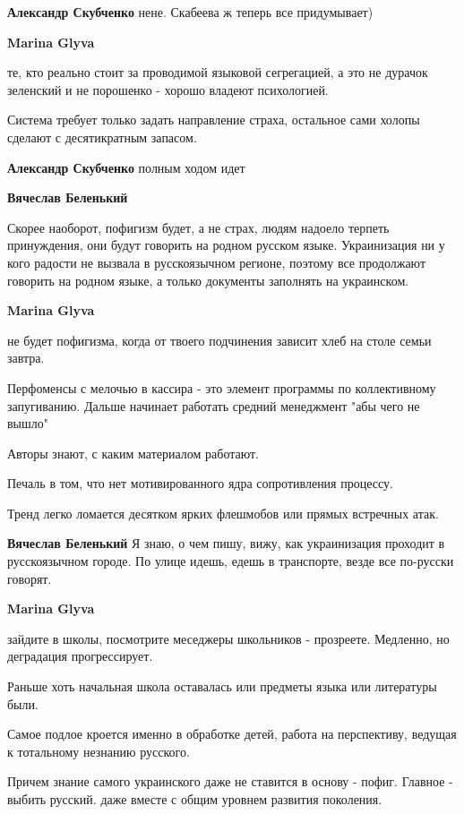 \begin{itemize}
\begin{itemize}
\textbf{Александр Скубченко} нене.
Скабеева ж теперь все придумывает)

\textbf{Marina Glyva} 

те, кто реально стоит за проводимой языковой сегрегацией, а это не дурачок
зеленский и не порошенко - хорошо владеют психологией.

Система требует только задать направление страха, остальное сами холопы сделают с десятикратным запасом.


\textbf{Александр Скубченко} полным ходом идет

\textbf{Вячеслав Беленький} 

Скорее наоборот, пофигизм будет, а не страх, людям надоело терпеть принуждения,
они будут говорить на родном русском языке. Украинизация ни у кого радости не
вызвала в русскоязычном регионе, поэтому все продолжают говорить на родном
языке, а только документы заполнять на украинском.

\textbf{Marina Glyva} 

не будет пофигизма, когда от твоего подчинения зависит хлеб на столе семьи
завтра.

Перфоменсы с мелочью в кассира - это элемент программы по коллективному
запугиванию. Дальше начинает работать средний менеджмент "абы чего не вышло"

Авторы знают, с каким материалом работают.

Печаль в том, что нет мотивированного ядра сопротивления процессу.

Тренд легко ломается десятком ярких флешмобов или прямых встречных атак.

\textbf{Вячеслав Беленький} Я знаю, о чем пишу, вижу, как украинизация проходит в русскоязычном городе. По улице идешь, едешь в транспорте, везде все по-русски говорят.

\textbf{Marina Glyva} 

зайдите в школы, посмотрите меседжеры школьников - прозреете. Медленно, но
деградация прогрессирует.

Раньше хоть начальная школа оставалась или предметы языка или литературы были.

Самое подлое кроется именно в обработке детей, работа на перспективу, ведущая к
тотальному незнанию русского.

Причем знание самого украинского даже не ставится в основу - пофиг. Главное -
выбить русский. даже вместе с общим уровнем развития поколения.


\end{itemize}
\end{itemize}
